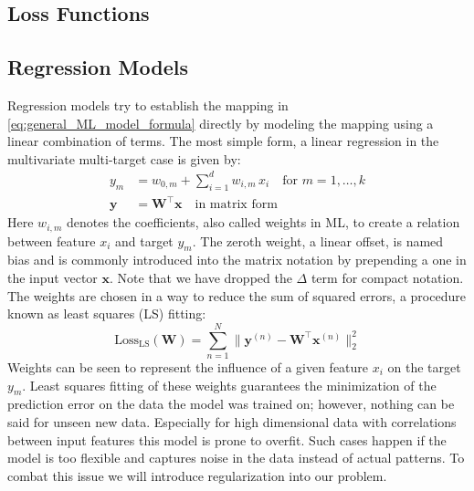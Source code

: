 \subsection{Loss Functions}
\label{subsec:background_loss_function}
\subsection{Regression Models}
\label{subsec:background_ml_model_types}
Regression models try to establish the mapping in \autoref{eq:general_ML_model_formula} directly by modeling the mapping using a linear combination of terms. The most simple form, a linear regression in the multivariate multi-target case is given by: 
\begin{equation}
    \label{eq:linear_regression_formula}
    \begin{aligned}
        y_m &= w_{0, m} + \sum_{i=1}^d w_{i,m} \, x_i \quad \text{for } m = 1, \dots, k\\
        \mathbf{y} &= \mathbf{W^\top} \mathbf{x} \quad \text{in matrix form}
    \end{aligned}
\end{equation}
Here $w_{i,m}$ denotes the coefficients, also called weights in ML, to create a relation between feature $x_i$ and target $y_m$. The zeroth weight, a linear offset, is named bias and is commonly introduced into the matrix notation by prepending a one in the input vector $\mathbf{x}$. Note that we have dropped the $\Delta$ term for compact notation. The weights are chosen in a way to reduce the sum of squared errors, a procedure known as least squares (LS) fitting: 
\begin{equation}
    \label{eq:least_squares_error}
    \text{Loss}_\text{LS}(\mathbf{W}) = \sum_{n=1}^{N}\|\mathbf{y}^{(n)} - \mathbf{W^\top} \mathbf{x}^{(n)}\|_2^2
\end{equation}
Weights can be seen to represent the influence of a given feature $x_i$ on the target $y_m$. Least squares fitting of these weights guarantees the minimization of the prediction error on the data the model was trained on; however, nothing can be said for unseen new data. Especially for high dimensional data with correlations between input features this model is prone to overfit. Such cases happen if the model is too flexible and captures noise in the data instead of actual patterns. To combat this issue we will introduce regularization into our problem.\\

